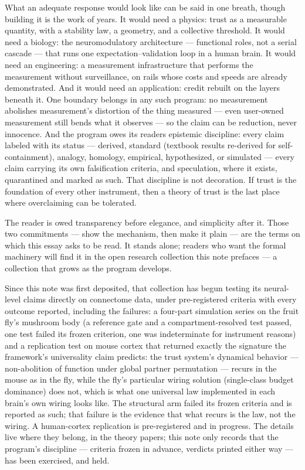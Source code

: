 \documentclass[
]{article}
\begin{document}
What an adequate response would look like can be said in one breath,
though building it is the work of years. It would need a physics: trust
as a measurable quantity, with a stability law, a geometry, and a
collective threshold. It would need a biology: the neuromodulatory
architecture --- functional roles, not a serial cascade --- that runs
one expectation--validation loop in a human brain. It would need an
engineering: a measurement infrastructure that performs the measurement
without surveillance, on rails whose costs and speeds are already
demonstrated. And it would need an application: credit rebuilt on the
layers beneath it. One boundary belongs in any such program: no
measurement abolishes measurement's distortion of the thing measured ---
even user-owned measurement still bends what it observes --- so the
claim can be reduction, never innocence. And the program owes its
readers epistemic discipline: every claim labeled with its status ---
derived, standard (textbook results re-derived for self-containment),
analogy, homology, empirical, hypothesized, or simulated --- every claim
carrying its own falsification criteria, and speculation, where it
exists, quarantined and marked as such. That discipline is not
decoration. If trust is the foundation of every other instrument, then a
theory of trust is the last place where overclaiming can be tolerated.

The reader is owed transparency before elegance, and simplicity after
it. Those two commitments --- show the mechanism, then make it plain ---
are the terms on which this essay asks to be read. It stands alone;
readers who want the formal machinery will find it in the open research
collection this note prefaces --- a collection that grows as the program
develops.

Since this note was first deposited, that collection has begun testing
its neural-level claims directly on connectome data, under
pre-registered criteria with every outcome reported, including the
failures: a four-part simulation series on the fruit fly's mushroom body
(a reference gate and a compartment-resolved test passed, one test
failed its frozen criterion, one was indeterminate for instrument
reasons) and a replication test on mouse cortex that returned exactly
the signature the framework's universality claim predicts: the trust
system's dynamical behavior --- non-abolition of function under global
partner permutation --- recurs in the mouse as in the fly, while the
fly's particular wiring solution (single-class budget dominance) does
not, which is what one universal law implemented in each brain's own
wiring looks like. The structural arm failed its frozen criteria and is
reported as such; that failure is the evidence that what recurs is the
law, not the wiring. A human-cortex replication is pre-registered and in
progress. The details live where they belong, in the theory papers; this
note only records that the program's discipline --- criteria frozen in
advance, verdicts printed either way --- has been exercised, and held.
\end{document}
